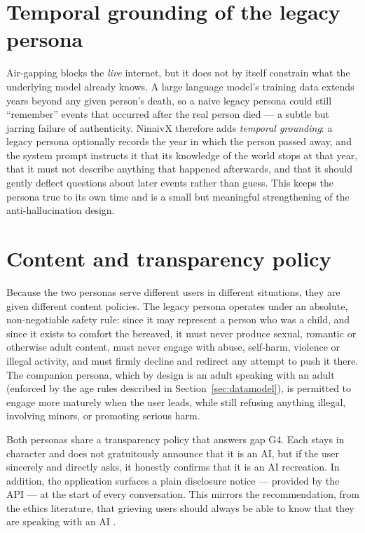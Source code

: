 \documentclass[11pt,a4paper]{report}
\begin{document}
\section{Temporal grounding of the legacy persona}
Air-gapping blocks the \emph{live} internet, but it does not by itself constrain what the underlying model already knows. A large language model's training data extends years beyond any given person's death, so a naive legacy persona could still ``remember'' events that occurred after the real person died --- a subtle but jarring failure of authenticity. NinaivX therefore adds \emph{temporal grounding}: a legacy persona optionally records the year in which the person passed away, and the system prompt instructs it that its knowledge of the world stops at that year, that it must not describe anything that happened afterwards, and that it should gently deflect questions about later events rather than guess. This keeps the persona true to its own time and is a small but meaningful strengthening of the anti-hallucination design.

\section{Content and transparency policy}
Because the two personas serve different users in different situations, they are given different content policies. The legacy persona operates under an absolute, non-negotiable safety rule: since it may represent a person who was a child, and since it exists to comfort the bereaved, it must never produce sexual, romantic or otherwise adult content, must never engage with abuse, self-harm, violence or illegal activity, and must firmly decline and redirect any attempt to push it there. The companion persona, which by design is an adult speaking with an adult (enforced by the age rules described in Section~\ref{sec:datamodel}), is permitted to engage more maturely when the user leads, while still refusing anything illegal, involving minors, or promoting serious harm.

Both personas share a transparency policy that answers gap G4. Each stays in character and does not gratuitously announce that it is an AI, but if the user sincerely and directly asks, it honestly confirms that it is an AI recreation. In addition, the application surfaces a plain disclosure notice --- provided by the API --- at the start of every conversation. This mirrors the recommendation, from the ethics literature, that grieving users should always be able to know that they are speaking with an AI \cite{hollanek2024griefbots}.
\end{document}
